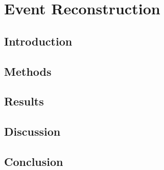 \chapter{Event Reconstruction}
\label{chapterlabel}

\blindtext

\section{Introduction}

\section{Methods}

\section{Results}

\section{Discussion}

\section{Conclusion}